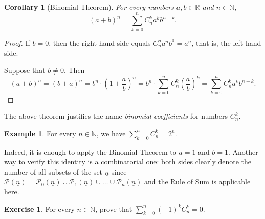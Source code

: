 \documentclass[12pt,notitlepage]{article}
\theoremstyle{plain}
\newtheorem{corr}[thm]{Corollary}
\theoremstyle{definition}
\newtheorem{exc}[thm]{Exercise}
\newtheorem{exm}[thm]{Example}
\theoremstyle{plain}
\newcommand{\N}{\mathbb{N}}
\newcommand{\R}{\mathbb{R}}
\newcommand{\mP}{\mathcal{P}}
\newcommand{\ul}[1]{\underline{#1}}
\newcommand{\1}{\mathbf{1}}
\newcommand{\0}{\mathbf{0}}
\begin{document}
\begin{corr}[Binomial Theorem]\label{L10:binom}
For every numbers $a, b \in \R$ and $n \in \N$,
$$(a + b)^n = \sum_{k = 0}^n C_n^k a^k b^{n-k}.$$
\end{corr}
\begin{proof}
If $b = 0$, then the right-hand side equals $C_n^n a^n b^0 = a^n$, that is, the left-hand side.

Suppose that $b \neq 0$. Then
$$(a + b)^n = (b + a)^n = b^n \cdot \left (1 + \dfrac{a}{b} \right)^n = b^n \cdot \sum_{k = 0}^n C_n^k \left ( \dfrac{a}{b} \right)^k = \sum_{k = 0}^n C_n^k a^k b^{n-k}.$$
\end{proof}
\noindent The above theorem justifies the name \emph{binomial coefficients} for numbers $C_n^k$.

\begin{exm}\label{L11:pow_2}
For every $n \in \N$, we have $\sum_{k = 0}^n C_n^k = 2^n$.

Indeed, it is enough to apply the Binomial Theorem to $a = 1$ and $b = 1$. Another way to verify this identity is a combinatorial one: both sides clearly denote the number of all subsets of the set $\ul{n}$ since $\mP(\ul{n}) = \mP_0(\ul{n}) \cup \mP_1(\ul{n}) \cup \ldots \cup \mP_n(\ul{n})$ and the Rule of Sum is applicable here.
\end{exm}

\begin{exc}
For every $n \in \N$, prove that $\sum_{k = 0}^n (-1)^k C_n^k = 0$.
\end{exc}
\end{document}
